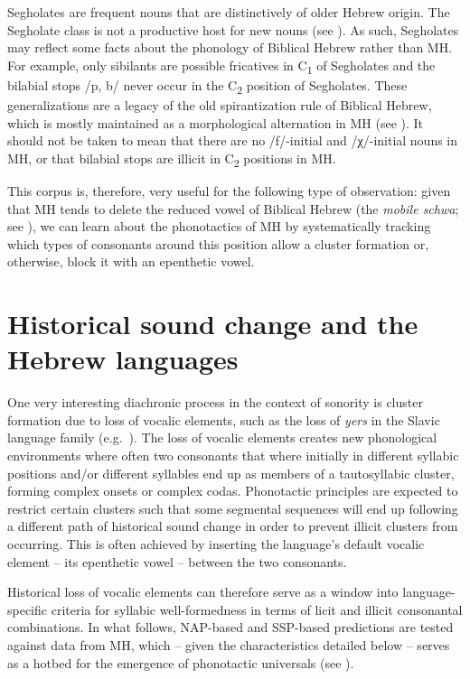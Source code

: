 Segholates are frequent nouns that are distinctively of older Hebrew origin. The Segholate class is not a productive host for new nouns (see \citealt{bolozky2020dictionarysk}). As such, Segholates may reflect some facts about the phonology of
Biblical Hebrew
rather than MH. For example, only sibilants are possible fricatives in C\textsubscript{1} of Segholates and the bilabial stops /p, b/ never occur in the C\textsubscript{2} position of Segholates. These generalizations are a legacy of the old spirantization rule of Biblical Hebrew, which is mostly maintained as a morphological alternation in MH (see \citealt{albert2019statesk}). It should not be taken to mean that there are no /f/-initial and /χ/-initial nouns in MH, or that bilabial stops are illicit in C\textsubscript{2} positions in MH.

This corpus is, therefore, very useful for the following type of observation: given that MH tends to delete the reduced vowel of Biblical Hebrew (the \emph{mobile schwa}; see ), we can learn about the phonotactics of MH by systematically tracking which types of consonants around this position allow a cluster formation or, otherwise, block it with an epenthetic vowel.

\section{Historical sound change and the Hebrew languages}\label{sec:historic}

One very interesting diachronic process in the context of sonority is cluster formation due to loss of vocalic elements, such as the loss of \emph{yers} in the Slavic language family (e.g.~\citealt{rubach1990edgesk, gouskova2013nonce, scheer2007statussk}). The loss of vocalic elements creates new phonological environments where often two consonants that where initially in different syllabic positions and/or different syllables end up as members of a tautosyllabic cluster, forming complex onsets or complex codas. Phonotactic principles are expected to restrict certain clusters such that some segmental sequences will end up following a different path of historical sound change in order to prevent illicit clusters from occurring. This is often achieved by inserting the language's default vocalic element -- its epenthetic vowel -- between the two consonants.

Historical loss of vocalic elements can therefore serve as a window into lan\-guage-specific criteria for syllabic well-formedness in terms of licit and illicit consonantal combinations.
In what follows, NAP-based and SSP-based predictions are tested against data from MH, which -- given the characteristics detailed below -- serves as a hotbed for the emergence of phonotactic universals (see \citealt{adam2002variable, albert2014phonotacticsk, batel2005phonologysk}).

